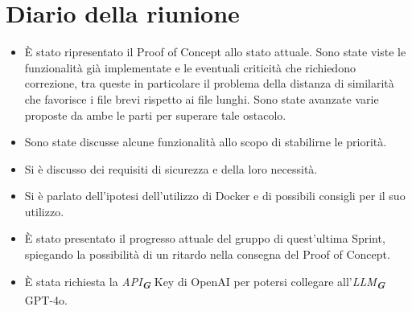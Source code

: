 
\section{Diario della riunione}

\begin{itemize}
    \item È stato ripresentato il Proof of Concept allo stato attuale. Sono state viste le funzionalità già implementate e le eventuali criticità che richiedono correzione, tra queste in particolare il problema della distanza di similarità che favorisce i file brevi rispetto ai file lunghi. Sono state avanzate varie proposte da ambe le parti per superare tale ostacolo.
    \item Sono state discusse alcune funzionalità allo scopo di stabilirne le priorità.
    \item Si è discusso dei requisiti di sicurezza e della loro necessità.
    \item Si è parlato dell'ipotesi dell'utilizzo di Docker e di possibili consigli per il suo utilizzo.
    \item È stato presentato il progresso attuale del gruppo di quest'ultima Sprint, spiegando la possibilità di un ritardo nella consegna del Proof of Concept.
    \item È stata richiesta la \emph{API}\textsubscript{\textbf{\textit{G}}} Key di OpenAI per potersi collegare all'\emph{LLM}\textsubscript{\textbf{\textit{G}}} GPT-4o.
\end{itemize}